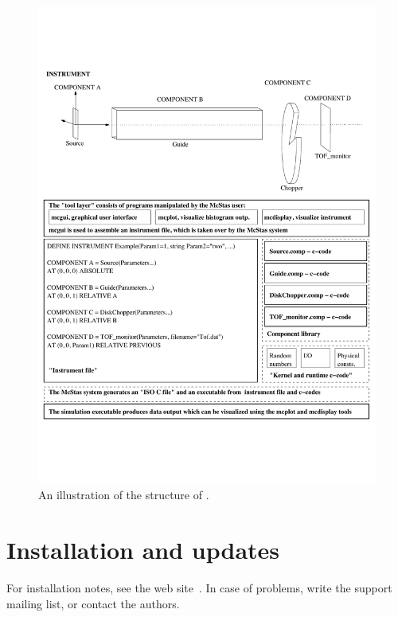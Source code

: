 \begin{figure}[pt!]
\begin{center}
    \includegraphics[width=\textwidth]{figures/mcstas_software.pdf}
\end{center}
\caption{An illustration of the structure of \MCS.}
\label{fig:structure}
\end{figure}

\section{Installation and updates}
\label{s:install}

For installation notes, see the web site~\cite{mcstas_webpage}.
In case of problems, write the support mailing list,
or contact the authors.

